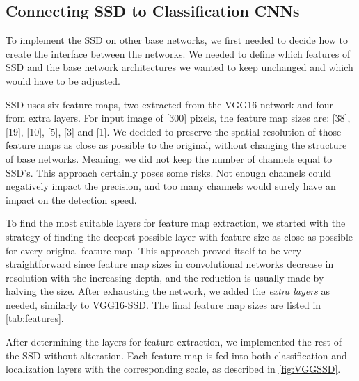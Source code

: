 \subsection{Connecting SSD to Classification CNNs}
To implement the SSD on other base networks, we first needed to decide how to create the interface between the networks. We needed to define which features of SSD and the base network architectures we wanted to keep unchanged and which would have to be adjusted.

SSD uses six feature maps, two extracted from the VGG16 network and four from extra layers. For input image of [300] pixels, the feature map sizes are: [38], [19], [10], [5], [3] and [1]. We decided to preserve the spatial resolution of those feature maps as close as possible to the original, without changing the structure of base networks. Meaning, we did not keep the number of channels equal to SSD's. This approach certainly poses some risks. Not enough channels could negatively impact the precision, and too many channels would surely have an impact on the detection speed.

To find the most suitable layers for feature map extraction, we started with the strategy of finding the deepest possible layer with feature size as close as possible for every original feature map. This approach proved itself to be very straightforward since feature map sizes in convolutional networks decrease in resolution with the increasing depth, and the reduction is usually made by halving the size. After exhausting the network, we added the \textit{extra layers} as needed, similarly to VGG16-SSD. The final feature map sizes are listed in \cref{tab:features}. 

After determining the layers for feature extraction, we implemented the rest of the SSD without alteration. Each feature map is fed into both classification and localization layers with the corresponding scale, as described in \cref{fig:VGGSSD}. 


